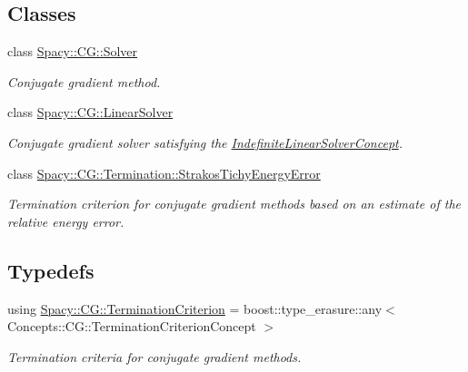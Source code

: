 \subsection*{Classes}
\begin{DoxyCompactItemize}
\item 
class \hyperlink{classSpacy_1_1CG_1_1Solver}{Spacy\+::\+C\+G\+::\+Solver}
\begin{DoxyCompactList}\small\item\em Conjugate gradient method. \end{DoxyCompactList}\item 
class \hyperlink{classSpacy_1_1CG_1_1LinearSolver}{Spacy\+::\+C\+G\+::\+Linear\+Solver}
\begin{DoxyCompactList}\small\item\em Conjugate gradient solver satisfying the \hyperlink{group__ConceptGroup_ga582dd34334cdecc7b27883f4e8239490_IndefiniteLinearSolverConceptAnchor}{Indefinite\+Linear\+Solver\+Concept}. \end{DoxyCompactList}\item 
class \hyperlink{classSpacy_1_1CG_1_1Termination_1_1StrakosTichyEnergyError}{Spacy\+::\+C\+G\+::\+Termination\+::\+Strakos\+Tichy\+Energy\+Error}
\begin{DoxyCompactList}\small\item\em Termination criterion for conjugate gradient methods based on an estimate of the relative energy error. \end{DoxyCompactList}\end{DoxyCompactItemize}
\subsection*{Typedefs}
\begin{DoxyCompactItemize}
\item 
using \hyperlink{group__CGGroup_gaa927be31b313bb4ce635668c77b55860_gaa927be31b313bb4ce635668c77b55860}{Spacy\+::\+C\+G\+::\+Termination\+Criterion} = boost\+::type\+\_\+erasure\+::any$<$ Concepts\+::\+C\+G\+::\+Termination\+Criterion\+Concept $>$
\begin{DoxyCompactList}\small\item\em Termination criteria for conjugate gradient methods. \end{DoxyCompactList}\end{DoxyCompactItemize}
